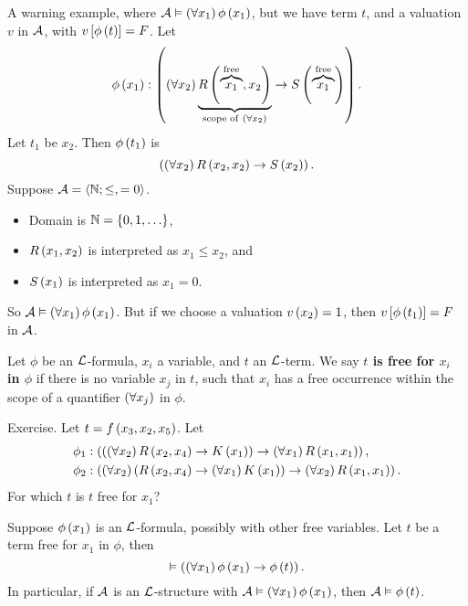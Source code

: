 \begin{example*}
A warning example, where $ \AA \vDash \fab{x_1}\phi\rb{x_1} $, but we have term $ t $, and a valuation $ v $ in $ \AA $, with $ v\sb{\phi\rb{t}} = F $. Let
$$ \phi\rb{x_1} : \impb{\fab{x_2}\underbrace{R\rb{\overbrace{x_1}^{\text{free}}, x_2}}_{\text{scope of} \ \fab{x_2}}}{S\rb{\overbrace{x_1}^{\text{free}}}}. $$
Let $ t_1 $ be $ x_2 $. Then $ \phi\rb{t_1} $ is
$$ \impb{\fab{x_2}R\rb{x_2, x_2}}{S\rb{x_2}}. $$
Suppose $ \AA = \ab{\N; \le, = 0} $.
\begin{itemize}
\item Domain is $ \N = \cb{0, 1, \dots} $,
\item $ R\rb{x_1, x_2} $ is interpreted as $ x_1 \le x_2 $, and
\item $ S\rb{x_1} $ is interpreted as $ x_1 = 0 $.
\end{itemize}
So $ \AA \vDash \fab{x_1}\phi\rb{x_1} $. But if we choose a valuation $ v\rb{x_2} = 1 $, then $ v\sb{\phi\rb{t_1}} = F $ in $ \AA $.
\end{example*}

\pagebreak

\begin{definition}
Let $ \phi $ be an $ \LL $-formula, $ x_i $ a variable, and $ t $ an $ \LL $-term. We say \textbf{$ t $ is free for $ x_i $ in $ \phi $} if there is no variable $ x_j $ in $ t $, such that $ x_i $ has a free occurrence within the scope of a quantifier $ \fab{x_j} $ in $ \phi $.
\end{definition}

\begin{example*}
Exercise. Let $ t = f\rb{x_3, x_2, x_5} $. Let
\begin{align*}
\phi_1 & : \impb{\impb{\fab{x_2}R\rb{x_2, x_4}}{K\rb{x_1}}}{\fab{x_1}R\rb{x_1, x_1}}, \\
\phi_2 & : \impb{\fab{x_2}\impb{R\rb{x_2, x_4}}{\fab{x_1}K\rb{x_1}}}{\fab{x_2}R\rb{x_1, x_1}}.
\end{align*}
For which $ t $ is $ t $ free for $ x_1 $?
\end{example*}

\begin{theorem}
\label{thm:2.3.6}
Suppose $ \phi\rb{x_1} $ is an $ \LL $-formula, possibly with other free variables. Let $ t $ be a term free for $ x_1 $ in $ \phi $, then
$$ \vDash \impb{\fab{x_1}\phi\rb{x_1}}{\phi\rb{t}}. $$
In particular, if $ \AA $ is an $ \LL $-structure with $ \AA \vDash \fab{x_1}\phi\rb{x_1} $, then $ \AA \vDash \phi\rb{t} $.
\end{theorem}

